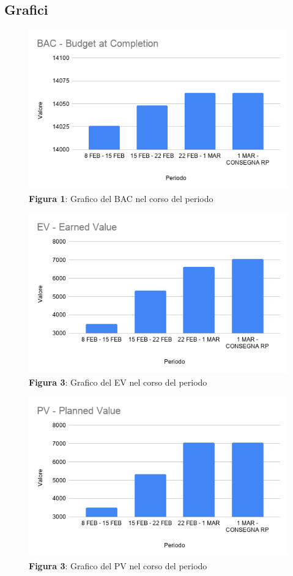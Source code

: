	\subsection{Grafici}
	\begin{figure}[H]
	\centering
	\includegraphics[width=0.7\linewidth]{res/images/BAC.png}
	\caption*{\textbf{Figura 1}: Grafico del BAC nel corso del periodo}
	\label{fig:Figura1}
\end{figure}

\begin{figure}[H]
	\centering
	\includegraphics[width=0.7\linewidth]{res/images/EV.png}
	\caption*{\textbf{Figura 3}: Grafico del EV nel corso del periodo}
	\label{fig:Figura2}
\end{figure}

\begin{figure}[H]
	\centering
	\includegraphics[width=0.7\linewidth]{res/images/PV.png}
	\caption*{\textbf{Figura 3}: Grafico del PV nel corso del periodo}
	\label{fig:Figura3}
\end{figure}
